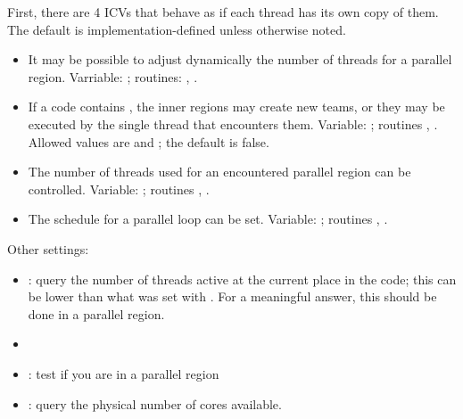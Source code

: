 First, there are 4 \acp{ICV} that behave as if each thread has its own copy of them.
The default is implementation-defined unless otherwise noted.
\begin{itemize}
  \item It may be possible to adjust dynamically the number of threads
    for a parallel region. Varriable: ;
    routines: ,
    .
  \item If a code contains ,
    the inner regions may create new teams, or they may be executed by
    the single thread that encounters them. Variable:
    ; routines ,
    . Allowed values are  and
    ; the default is false.
  \item The number of threads used for an encountered parallel region
    can be controlled. Variable: ;
    routines ,
    .
    \item The schedule for a parallel loop can be set. Variable:
      ; routines
      , .
\end{itemize}

Other settings:
\begin{itemize}
\item{}: query the number of threads
  active at the current place in the code; this can be lower than what
  was set with . For a meaningful answer, this
  should be done in a parallel region.
\item{}
\item{}: test if you are in a parallel region
\item{}: query the physical number of cores available.
\end{itemize}

